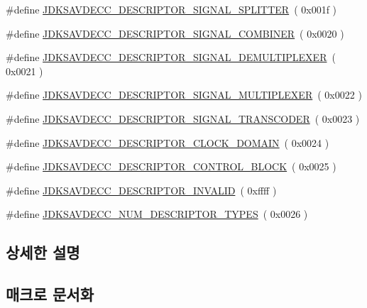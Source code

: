 \begin{DoxyCompactItemize}
$$\#define \hyperlink{group__descriptor_ga520bb7b795c17bc905faeff303746f93}{J\+D\+K\+S\+A\+V\+D\+E\+C\+C\+\_\+\+D\+E\+S\+C\+R\+I\+P\+T\+O\+R\+\_\+\+S\+I\+G\+N\+A\+L\+\_\+\+S\+P\+L\+I\+T\+T\+ER}~( 0x001f )
\item 
\#define \hyperlink{group__descriptor_gaacdd766767c4326ea929be2400b0f70b}{J\+D\+K\+S\+A\+V\+D\+E\+C\+C\+\_\+\+D\+E\+S\+C\+R\+I\+P\+T\+O\+R\+\_\+\+S\+I\+G\+N\+A\+L\+\_\+\+C\+O\+M\+B\+I\+N\+ER}~( 0x0020 )
\item 
\#define \hyperlink{group__descriptor_gaa6920df982a60c54b6300c2e83392776}{J\+D\+K\+S\+A\+V\+D\+E\+C\+C\+\_\+\+D\+E\+S\+C\+R\+I\+P\+T\+O\+R\+\_\+\+S\+I\+G\+N\+A\+L\+\_\+\+D\+E\+M\+U\+L\+T\+I\+P\+L\+E\+X\+ER}~( 0x0021 )
\item 
\#define \hyperlink{group__descriptor_ga9f323b5d0cb8487ba1ec959d1807547f}{J\+D\+K\+S\+A\+V\+D\+E\+C\+C\+\_\+\+D\+E\+S\+C\+R\+I\+P\+T\+O\+R\+\_\+\+S\+I\+G\+N\+A\+L\+\_\+\+M\+U\+L\+T\+I\+P\+L\+E\+X\+ER}~( 0x0022 )
\item 
\#define \hyperlink{group__descriptor_ga5c5bfdf2dcf06103dcda608cae546548}{J\+D\+K\+S\+A\+V\+D\+E\+C\+C\+\_\+\+D\+E\+S\+C\+R\+I\+P\+T\+O\+R\+\_\+\+S\+I\+G\+N\+A\+L\+\_\+\+T\+R\+A\+N\+S\+C\+O\+D\+ER}~( 0x0023 )
\item 
\#define \hyperlink{group__descriptor_ga589df1006298ffeb54b5c7e5a831b062}{J\+D\+K\+S\+A\+V\+D\+E\+C\+C\+\_\+\+D\+E\+S\+C\+R\+I\+P\+T\+O\+R\+\_\+\+C\+L\+O\+C\+K\+\_\+\+D\+O\+M\+A\+IN}~( 0x0024 )
\item 
\#define \hyperlink{group__descriptor_ga458d8cef9e8299596f5b017b3ce348ed}{J\+D\+K\+S\+A\+V\+D\+E\+C\+C\+\_\+\+D\+E\+S\+C\+R\+I\+P\+T\+O\+R\+\_\+\+C\+O\+N\+T\+R\+O\+L\+\_\+\+B\+L\+O\+CK}~( 0x0025 )
\item 
\#define \hyperlink{group__descriptor_ga7966994e6859e6d286753aed28b989c5}{J\+D\+K\+S\+A\+V\+D\+E\+C\+C\+\_\+\+D\+E\+S\+C\+R\+I\+P\+T\+O\+R\+\_\+\+I\+N\+V\+A\+L\+ID}~( 0xffff )
\item 
\#define \hyperlink{group__descriptor_gadfb8b289bbee62e041de59018b7ce3d3}{J\+D\+K\+S\+A\+V\+D\+E\+C\+C\+\_\+\+N\+U\+M\+\_\+\+D\+E\+S\+C\+R\+I\+P\+T\+O\+R\+\_\+\+T\+Y\+P\+ES}~( 0x0026 )
\end{DoxyCompactItemize}


\subsection{상세한 설명}


\subsection{매크로 문서화}
